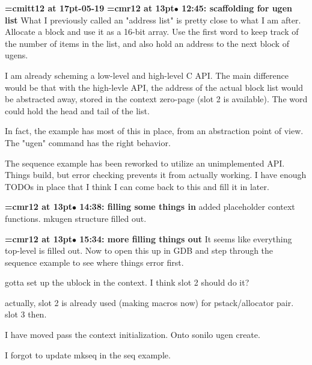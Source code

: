{\medskip\noindent\bf\font\titlefont=cmitt12 at 17pt-05-19}\medskip
{\smallskip\noindent\bf\font\titlefont=cmr12 at 13pt\titlefont $\bullet$ 12:45: scaffolding for ugen list}\smallskip
What I previously called an "address list" is pretty close to what I am after. Allocate a block and use it as a 16-bit array. Use the first word to keep track of the number of items in the list, and also hold an address to the next block of ugens.
\par

I am already scheming a low-level and high-level C API. The main difference would be that with the high-levle API, the address of the actual block list would be abstracted away, stored in the context zero-page (slot 2 is available). The word could hold the head and tail of the list.
\par

In fact, the example has most of this in place, from an abstraction point of view. The "ugen" command has the right behavior.
\par

The sequence example has been reworked to utilize an unimplemented API. Things build, but error checking prevents it from actually working. I have enough TODOs in place that I think I can come back to this and fill it in later.
\par

{\smallskip\noindent\bf\font\titlefont=cmr12 at 13pt\titlefont $\bullet$ 14:38: filling some things in}\smallskip
added placeholder context functions. mkugen structure filled out.
\par

{\smallskip\noindent\bf\font\titlefont=cmr12 at 13pt\titlefont $\bullet$ 15:34: more filling things out}\smallskip
It seems like everything top-level is filled out. Now to open this up in GDB and step through the sequence example to see where things error first.
\par

gotta set up the ublock in the context. I think slot 2 should do it?
\par

actually, slot 2 is already used (making macros now) for pstack/allocator pair. slot 3 then.
\par

I have moved pass the context initialization. Onto sonilo ugen create.
\par

I forgot to update mkseq in the seq example.
\par

